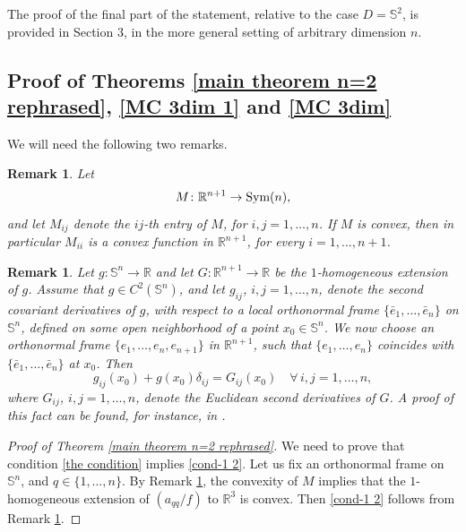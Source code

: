 \documentclass[12pt]{amsart}
\newtheorem{remark}[theorem]{Remark}
\newcommand{\R}{\mathbb R}
\newcommand{\1}{\mathbf 1}
\newcommand{\s}{\mathbb S}
\newcommand{\sfe}{{{\mathbb S}^{n}}}
\newcommand{\symm}{\mbox{\rm Sym}}
\begin{document}
The proof of the final part of the statement, relative to the case $D=\s^2$, is provided in Section 3, in the more general setting of arbitrary dimension $n$.


\subsection{Proof of Theorems \ref{main theorem n=2 rephrased}, \ref{MC 3dim 1} and \ref{MC 3dim}}\label{sec. MC problem dim three}

We will need the following two remarks.

\begin{remark}\label{diagonal}
Let
$$
M\colon\R^{n+1}\to\symm(n),
$$
and let $M_{ij}$ denote the $ij$-th entry of $M$, for $i,j=1,\dots,n$. If $M$ is convex, then in particular $M_{ii}$ is a convex function in $\R^{n+1}$, for every $i=1,\dots,n+1$.  
\end{remark}

\begin{remark}\label{one-hom}
Let $g\colon\sfe\to\R$ and let $G\colon\R^{n+1}\to\R$ be the $1$-homogeneous extension of $g$. Assume that $g\in C^2(\sfe)$, and let $g_{ij}$, $i,j=1,\dots,n$, denote the second covariant derivatives of $g$, with respect to a local orthonormal frame $\{\bar e_1,\dots,\bar e_n\}$ on $\sfe$, defined on some open neighborhood of a point $x_0\in\sfe$. We now choose an orthonormal frame $\{e_1,\dots,e_n,e_{n+1}\}$ in $\R^{n+1}$, such that $\{e_1,\dots,e_n\}$ coincides with $\{\bar e_1,\dots,\bar e_n\}$ at $x_0$. Then
$$
g_{ij}(x_0)+g(x_0)\delta_{ij}=G_{ij}(x_0)\quad\forall\, i,j=1,\dots,n,
$$
where $G_{ij}$, $i,j=1,\dots,n$, denote the Euclidean second derivatives of $G$. A proof of this fact can be found, for instance, in \cite[Appendix]{Colesanti-Hug-Saorin-2014}.
\end{remark}

\begin{proof}[Proof of Theorem \ref{main theorem n=2 rephrased}] We need to prove that condition \eqref{the condition} implies \eqref{cond-1 2}. Let us fix an orthonormal frame on $\sfe$, and $q\in\{1,\dots,n\}$. By Remark \ref{diagonal}, the convexity of $M$ implies that the $1$-homogeneous extension of $(a_{qq}/f)$ to $\R^{3}$ is convex. Then \eqref{cond-1 2} follows from Remark \ref{one-hom}. 
\end{proof}
\end{document}
